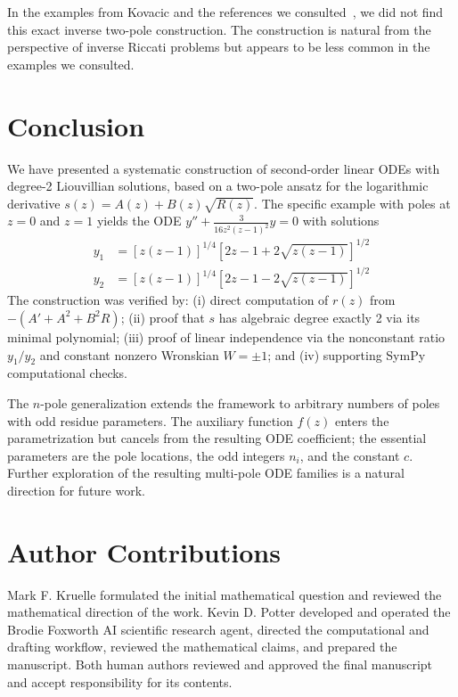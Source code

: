 \documentclass[11pt,a4paper]{article}
\theoremstyle{definition}
\begin{document}
In the examples from Kovacic and the references we consulted~\cite{kovacic1986, vanderput2003, singer1991, kovacic1986notes}, we did not find this exact inverse two-pole construction. The construction is natural from the perspective of inverse Riccati problems but appears to be less common in the examples we consulted.

\section{Conclusion}

We have presented a systematic construction of second-order linear ODEs with degree-2 Liouvillian solutions, based on a two-pole ansatz for the logarithmic derivative \(s(z) = A(z) + B(z)\sqrt{R(z)}\). The specific example with poles at \(z=0\) and \(z=1\) yields the ODE \(y'' + \frac{3}{16z^2(z-1)^2}y = 0\) with solutions
\begin{align*}
y_1 &= [z(z-1)]^{1/4}[2z-1 + 2\sqrt{z(z-1)}]^{1/2} \\
y_2 &= [z(z-1)]^{1/4}[2z-1 - 2\sqrt{z(z-1)}]^{1/2}
\end{align*}
The construction was verified by: (i) direct computation of \(r(z)\) from \(-(A' + A^2 + B^2R)\); (ii) proof that \(s\) has algebraic degree exactly 2 via its minimal polynomial; (iii) proof of linear independence via the nonconstant ratio \(y_1/y_2\) and constant nonzero Wronskian \(W=\pm 1\); and (iv) supporting SymPy computational checks.

The \(n\)-pole generalization extends the framework to arbitrary numbers of poles with odd residue parameters. The auxiliary function \(f(z)\) enters the parametrization but cancels from the resulting ODE coefficient; the essential parameters are the pole locations, the odd integers \(n_i\), and the constant \(c\). Further exploration of the resulting multi-pole ODE families is a natural direction for future work.

\section*{Author Contributions}
Mark F. Kruelle formulated the initial mathematical question and reviewed the mathematical direction of the work. Kevin D. Potter developed and operated the Brodie Foxworth AI scientific research agent, directed the computational and drafting workflow, reviewed the mathematical claims, and prepared the manuscript. Both human authors reviewed and approved the final manuscript and accept responsibility for its contents.
\end{document}
